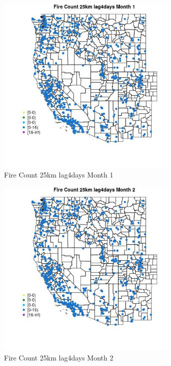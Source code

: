 \begin{figure} 
\centering  
\includegraphics[width=0.77\textwidth]{Code_Outputs/Report_ML_input_PM25_Step4_part_e_de_duplicated_aves_compiled_2019-05-21wNAs_MapObsMo1Fire_Count_25km_lag4days.jpg} 
\caption{\label{fig:Report_ML_input_PM25_Step4_part_e_de_duplicated_aves_compiled_2019-05-21wNAsMapObsMo1Fire_Count_25km_lag4days}Fire Count 25km lag4days Month 1} 
\end{figure} 
 

\begin{figure} 
\centering  
\includegraphics[width=0.77\textwidth]{Code_Outputs/Report_ML_input_PM25_Step4_part_e_de_duplicated_aves_compiled_2019-05-21wNAs_MapObsMo2Fire_Count_25km_lag4days.jpg} 
\caption{\label{fig:Report_ML_input_PM25_Step4_part_e_de_duplicated_aves_compiled_2019-05-21wNAsMapObsMo2Fire_Count_25km_lag4days}Fire Count 25km lag4days Month 2} 
\end{figure} 
 

